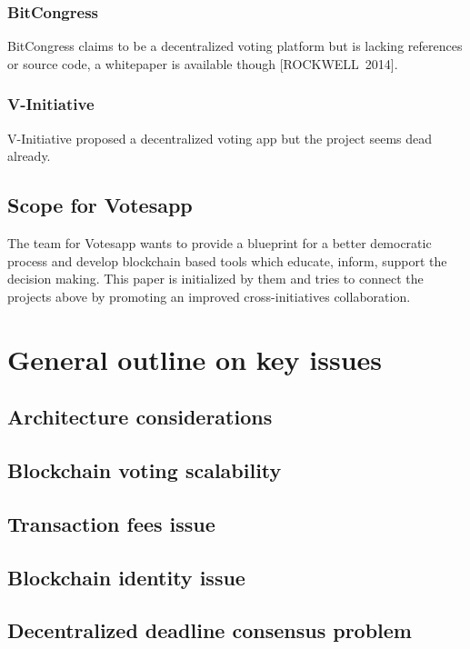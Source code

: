 \documentclass[9pt,oneside]{amsart}
\begin{document}
\begin{multicols}{2}
\subsubsection{BitCongress}
BitCongress claims to be a decentralized voting platform but is lacking references or source code, a whitepaper is available though [ROCKWELL~2014].
\subsubsection{V-Initiative}
V-Initiative proposed a decentralized voting app but the project seems dead already.

\subsection{Scope for Votesapp}
The team for Votesapp wants to provide a blueprint for a better democratic process and develop blockchain based tools which educate, inform, support the decision making. This paper is initialized by them and tries to connect the projects above by promoting an improved cross-initiatives collaboration.

\section{General outline on key issues}

\subsection{Architecture considerations}

\subsection{Blockchain voting scalability}

\subsection{Transaction fees issue}

\subsection{Blockchain identity issue}

\subsection{Decentralized deadline consensus problem}


\end{multicols}
\end{document}
